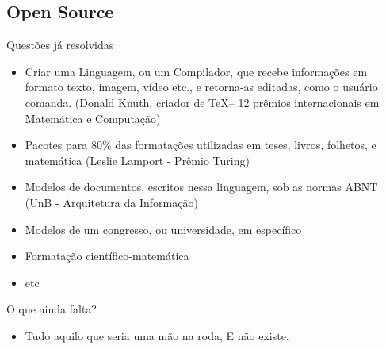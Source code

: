 \documentclass{beamer}
\begin{document}
\begin{frame}

  \section{Open Source}
  \pause

  \begin{block}{Questões já resolvidas}
    \begin{itemize}
    \item<3->\alert{Criar} uma Linguagem, ou um Compilador, que recebe informações em formato
      texto, imagem, vídeo etc., e retorna-as editadas, como o
      usuário comanda. (Donald Knuth, criador de \TeX -- 12 prêmios
      internacionais em Matemática e Computação)
    \item<4-> Pacotes para 80\% das formatações utilizadas em teses,
      livros, folhetos, e matemática (Leslie Lamport - Prêmio Turing)
    \item<5->{Modelos de documentos, escritos nessa linguagem, sob as
        normas  ABNT} (UnB - Arquitetura da Informação)
    \item<6->{Modelos de um congresso, ou universidade, em específico}
    \item<6->{Formatação científico-matemática}
    \item<6->{etc}
    \end{itemize}
  \end{block}

  \begin{block}{O que ainda falta?}
    \begin{itemize}
    \item<1-> Tudo aquilo que seria uma mão na roda, \alert{E} não
        existe.
    \end{itemize}
  \end{block}
\end{frame}
\end{document}
